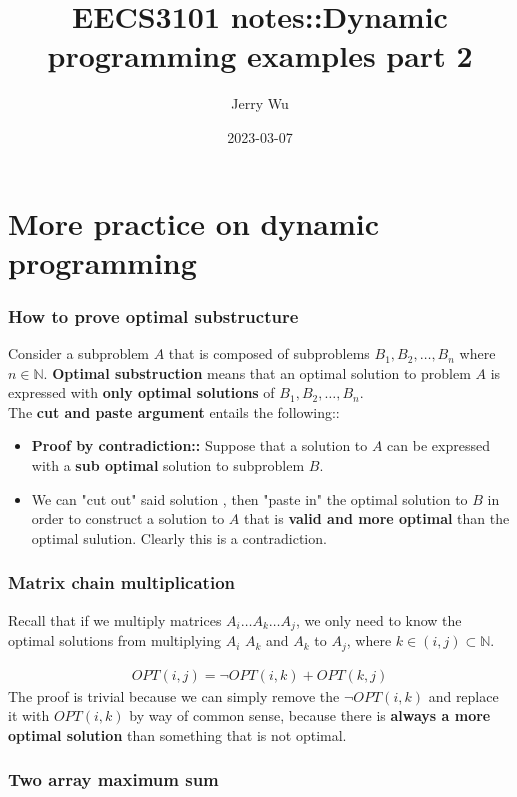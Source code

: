 \documentclass[12pt]{book}
\title{EECS3101 notes::Dynamic programming examples part 2}
\author{Jerry Wu}
\date{2023-03-07}
\begin{document}
\maketitle

\chapter*{More practice on dynamic programming}

\subsection*{How to prove optimal substructure}

Consider a subproblem $A$ that is composed of subproblems $B_1,B_2,\ldots,B_n$ where $n\in \mathbb{N}$. \textbf{Optimal substruction} means that an optimal solution to problem $A$ is expressed with \textbf{only optimal solutions} of $B_1,B_2,\ldots,B_n$.\\
The \textbf{cut and paste argument} entails the following::

\begin{itemize}
    \item \textbf{Proof by contradiction::} Suppose that a solution to $A$ can be expressed with a \textbf{sub optimal} solution to subproblem $B$.
    \item We can "cut out" said solution , then "paste in" the optimal solution to $B$ in order to construct a solution to $A$ that is \textbf{valid and more optimal} than the optimal sulution. Clearly this is a contradiction.
\end{itemize}

\subsection*{Matrix chain multiplication}

Recall that if we multiply matrices $A_i\ldots A_k\ldots A_j$, we only need to know the optimal solutions from multiplying $A_i$ $A_k$ and $A_k$ to $A_j$, where $k\in(i,j)\subset\mathbb{N}$.

\begin{align*}
    OPT(i,j)=\lnot OPT(i,k)+OPT(k,j)
\end{align*}
The proof is trivial because we can simply remove the $\lnot OPT(i,k)$ and replace it with $OPT(i,k)$ by way of common sense, because there is \textbf{always a more optimal solution} than something that is not optimal.
\newpage
\subsection*{Two array maximum sum}
\end{document}
